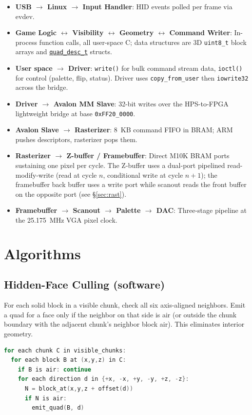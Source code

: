 \documentclass[11pt]{article}
\begin{document}
\begin{itemize}
\item \textbf{USB $\rightarrow$ Linux $\rightarrow$ Input Handler}: HID events polled per frame via evdev.
\item \textbf{Game Logic $\leftrightarrow$ Visibility $\leftrightarrow$ Geometry $\leftrightarrow$ Command Writer}: In-process function calls, all user-space C; data structures are 3D \texttt{uint8\_t} block arrays and \hyperref[sec:quaddesc]{\texttt{quad\_desc\_t}} structs.
\item \textbf{User space $\rightarrow$ Driver}: \texttt{write()} for bulk command stream data, \texttt{ioctl()} for control (palette, flip, status). Driver uses \texttt{copy\_from\_user} then \texttt{iowrite32} across the bridge.
\item \textbf{Driver $\rightarrow$ Avalon MM Slave}: 32-bit writes over the HPS-to-FPGA lightweight bridge at base \texttt{0xFF20\_0000}.
\item \textbf{Avalon Slave $\rightarrow$ Rasterizer}: 8~KB command FIFO in BRAM; ARM pushes descriptors, rasterizer pops them.
\item \textbf{Rasterizer $\rightarrow$ Z-buffer / Framebuffer}: Direct M10K BRAM ports sustaining one pixel per cycle. The Z-buffer uses a dual-port pipelined read-modify-write (read at cycle $n$, conditional write at cycle $n{+}1$); the framebuffer back buffer uses a write port while scanout reads the front buffer on the opposite port (see \S\ref{sec:rast}).
\item \textbf{Framebuffer $\rightarrow$ Scanout $\rightarrow$ Palette $\rightarrow$ DAC}: Three-stage pipeline at the 25.175~MHz VGA pixel clock.
\end{itemize}

\section{Algorithms}

\subsection{Hidden-Face Culling (software)}

For each solid block in a visible chunk, check all six axis-aligned neighbors. Emit a quad for a face only if the neighbor on that side is air (or outside the chunk boundary with the adjacent chunk's neighbor block air). This eliminates interior geometry.

\begin{lstlisting}[language=C]
for each chunk C in visible_chunks:
  for each block B at (x,y,z) in C:
    if B is air: continue
    for each direction d in {+x, -x, +y, -y, +z, -z}:
      N = block_at(x,y,z + offset(d))
      if N is air:
        emit_quad(B, d)
\end{lstlisting}
\end{document}
